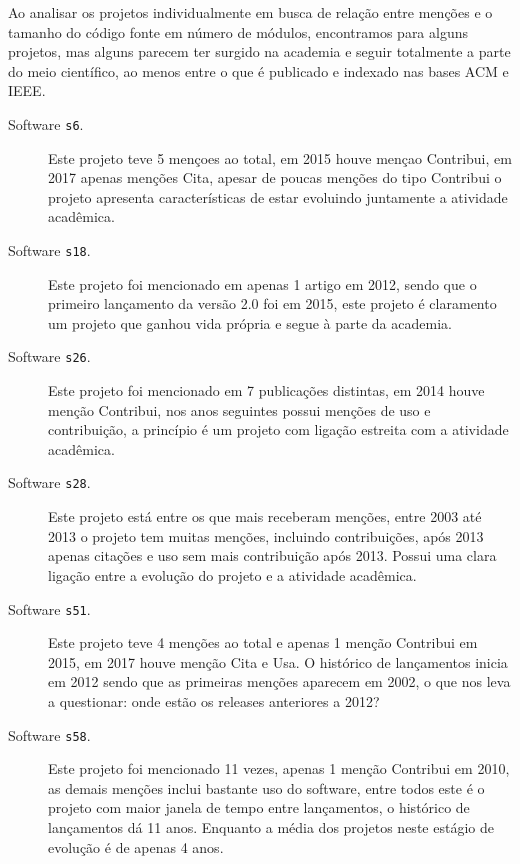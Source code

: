Ao analisar os projetos individualmente em busca de relação entre
menções e o tamanho do código fonte em número de módulos, encontramos para alguns projetos, mas alguns parecem
ter surgido na academia e seguir totalmente a parte do meio científico, ao
menos entre o que é publicado e indexado nas bases ACM e IEEE.

\begin{description}

  \item[Software \texttt{s6}.]
    Este projeto teve 5 mençoes ao total, em 2015 houve mençao Contribui, em
    2017 apenas menções Cita, apesar de poucas menções do tipo Contribui o
    projeto apresenta características de estar evoluindo juntamente a atividade
    acadêmica.

  \item[Software \texttt{s18}.]
    Este projeto foi mencionado em apenas 1 artigo em 2012, sendo que o
    primeiro lançamento da versão 2.0 foi em 2015, este projeto é claramento um
    projeto que ganhou vida própria e segue à parte da academia.

  \item[Software \texttt{s26}.]
    Este projeto foi mencionado em 7 publicações distintas, em 2014 houve
    menção Contribui, nos anos seguintes possui menções de uso e contribuição,
    a princípio é um projeto com ligação estreita com a atividade acadêmica.

  \item[Software \texttt{s28}.]
    Este projeto está entre os que mais receberam menções, entre 2003 até 2013
    o projeto tem muitas menções, incluindo contribuições, após 2013 apenas
    citações e uso sem mais contribuição após 2013. Possui uma clara ligação
    entre a evolução do projeto e a atividade acadêmica.

  \item[Software \texttt{s51}.]
    Este projeto teve 4 menções ao total e apenas 1 menção Contribui em 2015,
    em 2017 houve menção Cita e Usa. O histórico de lançamentos inicia em 2012
    sendo que as primeiras menções aparecem em 2002, o que nos leva a
    questionar: onde estão os releases anteriores a 2012?

  \item[Software \texttt{s58}.]
    Este projeto foi mencionado 11 vezes, apenas 1 menção Contribui em 2010, as
    demais menções inclui bastante uso do software, entre todos este é o
    projeto com maior janela de tempo entre lançamentos, o histórico de
    lançamentos dá 11 anos. Enquanto a média dos projetos neste estágio de evolução
    é de apenas 4 anos.

\end{description}

